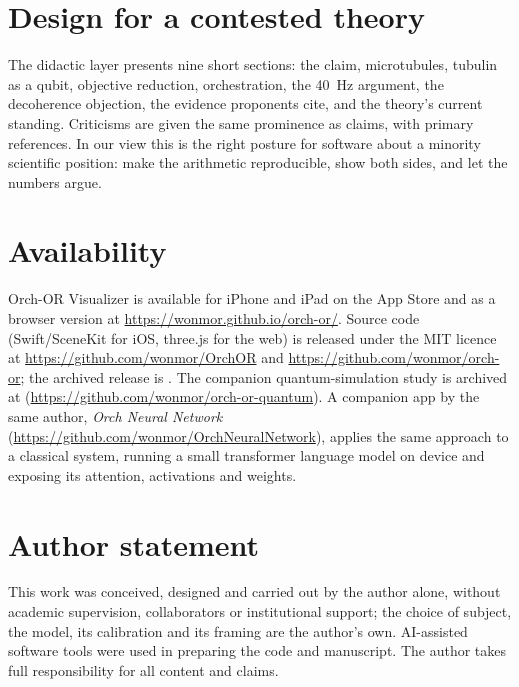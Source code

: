 \documentclass[11pt]{article}
\begin{document}
\section{Design for a contested theory}
The didactic layer presents nine short sections: the claim, microtubules, tubulin as a qubit, objective reduction, orchestration, the 40~Hz argument, the decoherence objection, the evidence proponents cite, and the theory's current standing. Criticisms are given the same prominence as claims, with primary references. In our view this is the right posture for software about a minority scientific position: make the arithmetic reproducible, show both sides, and let the numbers argue.

\section{Availability}
Orch-OR Visualizer is available for iPhone and iPad on the App Store and as a browser version at \url{https://wonmor.github.io/orch-or/}. Source code (Swift/SceneKit for iOS, three.js for the web) is released under the MIT licence at \url{https://github.com/wonmor/OrchOR} and \url{https://github.com/wonmor/orch-or}; the archived release is . The companion quantum-simulation study is archived at  (\url{https://github.com/wonmor/orch-or-quantum}). A companion app by the same author, \emph{Orch Neural Network} (\url{https://github.com/wonmor/OrchNeuralNetwork}), applies the same approach to a classical system, running a small transformer language model on device and exposing its attention, activations and weights.

\section*{Author statement}
This work was conceived, designed and carried out by the author alone, without academic supervision, collaborators or institutional support; the choice of subject, the model, its calibration and its framing are the author's own. AI-assisted software tools were used in preparing the code and manuscript. The author takes full responsibility for all content and claims.
\end{document}
